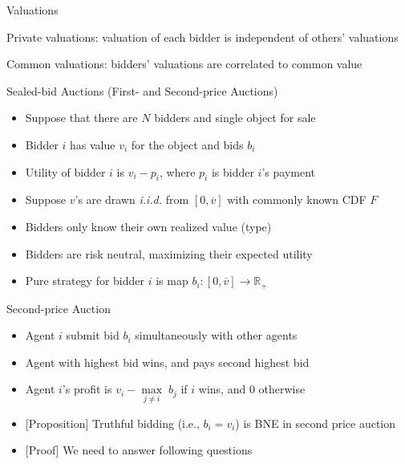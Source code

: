 \documentclass[11pt,aspectratio=169]{beamer}
\begin{document}
  
  \begin{frame}{Valuations}
   \begin{itemizes}[2em]
    \item \alert{Private valuations}: valuation of each bidder is independent of others' valuations
    \item \alert{Common valuations}: bidders' valuations are correlated to common value
   \end{itemizes}
  \end{frame}


  \begin{frame}{Sealed-bid Auctions (First- and Second-price Auctions)}
   \begin{itemize}[<+->]
   \setlength{\itemsep}{0.5em}
    \item Suppose that there are $N$ bidders and single object for sale
    \item Bidder $i$ has value $v_i$ for the object and bids $b_i$
    \item Utility of bidder $i$ is $v_i - p_i$, where $p_i$ is bidder $i$'s payment
    \item Suppose $v$'s  are drawn \textit{i.i.d.} from $[0,\overline{v}]$ with commonly known CDF $F$
    \item Bidders only know their own realized value (type)
    \item Bidders are risk neutral, maximizing their expected utility
    \item Pure strategy for bidder $i$ is map $b_i:[0,\overline{v} ]\rightarrow \mathbb{R}_+$
   \end{itemize}
  \end{frame}


  \begin{frame}{Second-price Auction}
   \begin{itemize}[<+->]
   \setlength{\itemsep}{1em}
    \item Agent $i$ submit bid $b_i$ simultaneously with other agents
    \item Agent with highest bid wins, and pays second highest bid
    \item Agent $i$'s profit is $v_i - \underset{j\ne i}{\max} \; b_j$ if $i$ wins, and 0 otherwise
    \item \alert{[Proposition]} Truthful bidding (i.e., $b_i = v_i$) is BNE in second price auction
    \item \alert{[Proof]} We need to answer following questions
   \end{itemize}
  \end{frame}
\end{document}
